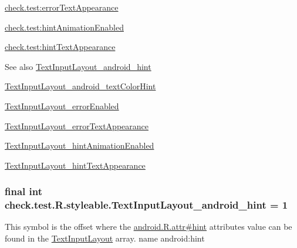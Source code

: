 {\ttfamily \hyperlink{classcheck_1_1test_1_1_r_1_1styleable_af1730eaed5795cdf53e63a5527d2d006}{check.\+test\+:error\+Text\+Appearance}}

{\ttfamily \hyperlink{classcheck_1_1test_1_1_r_1_1styleable_a8faed29d074a302a57bd6d80e27ad39a}{check.\+test\+:hint\+Animation\+Enabled}}

{\ttfamily \hyperlink{classcheck_1_1test_1_1_r_1_1styleable_a9604a717bdd44907e80a794e886f45cb}{check.\+test\+:hint\+Text\+Appearance}}

\begin{DoxySeeAlso}{See also}
\hyperlink{classcheck_1_1test_1_1_r_1_1styleable_ad6a5cba28470d2e39b5a58db528e9851}{Text\+Input\+Layout\+\_\+android\+\_\+hint} 

\hyperlink{classcheck_1_1test_1_1_r_1_1styleable_acec272e290ec4a23a75d437f8712b96a}{Text\+Input\+Layout\+\_\+android\+\_\+text\+Color\+Hint} 

\hyperlink{classcheck_1_1test_1_1_r_1_1styleable_a61fd0cbc829c3fa93cc7a808bc58231e}{Text\+Input\+Layout\+\_\+error\+Enabled} 

\hyperlink{classcheck_1_1test_1_1_r_1_1styleable_af1730eaed5795cdf53e63a5527d2d006}{Text\+Input\+Layout\+\_\+error\+Text\+Appearance} 

\hyperlink{classcheck_1_1test_1_1_r_1_1styleable_a8faed29d074a302a57bd6d80e27ad39a}{Text\+Input\+Layout\+\_\+hint\+Animation\+Enabled} 

\hyperlink{classcheck_1_1test_1_1_r_1_1styleable_a9604a717bdd44907e80a794e886f45cb}{Text\+Input\+Layout\+\_\+hint\+Text\+Appearance} 
\end{DoxySeeAlso}
\hypertarget{classcheck_1_1test_1_1_r_1_1styleable_ad6a5cba28470d2e39b5a58db528e9851}{}
\subsubsection[{Text\+Input\+Layout\+\_\+android\+\_\+hint}]{\setlength{\rightskip}{0pt plus 5cm}final int check.\+test.\+R.\+styleable.\+Text\+Input\+Layout\+\_\+android\+\_\+hint = 1\hspace{0.3cm}{\ttfamily [static]}}\label{classcheck_1_1test_1_1_r_1_1styleable_ad6a5cba28470d2e39b5a58db528e9851}
This symbol is the offset where the \hyperlink{}{android.\+R.\+attr\#hint} attribute\textquotesingle{}s value can be found in the \hyperlink{classcheck_1_1test_1_1_r_1_1styleable_a56e445e43589d92521fa1b8fd6e2e470}{Text\+Input\+Layout} array.  name android\+:hint \hypertarget{classcheck_1_1test_1_1_r_1_1styleable_acec272e290ec4a23a75d437f8712b96a}{}
